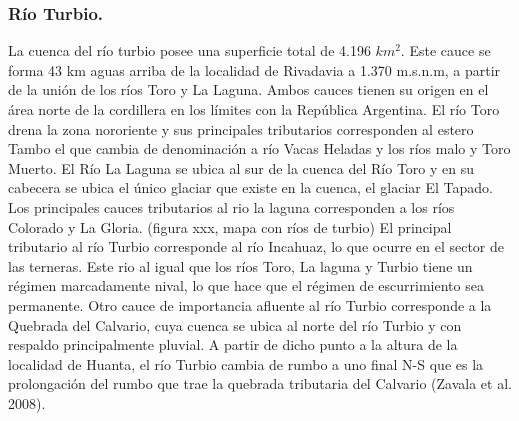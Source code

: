 \documentclass[10pt,]{article}
\begin{document}
		\subsubsection{Río Turbio.}
La cuenca del río turbio posee una superficie total de 4.196 $km^2$. Este cauce se forma 43 km aguas arriba de la localidad de Rivadavia a 1.370 m.s.n.m, a partir de la unión de los ríos Toro y La Laguna. Ambos cauces tienen su origen en el área norte de la cordillera en los límites con la República Argentina. El río Toro drena la zona nororiente y sus principales tributarios corresponden al estero Tambo el que cambia de denominación a río Vacas Heladas y los ríos malo y Toro Muerto. El Río La Laguna se ubica al sur de la cuenca del Río Toro y en su cabecera se ubica el único glaciar que existe en la cuenca, el glaciar El Tapado. Los principales cauces tributarios al rio la laguna corresponden a los ríos Colorado y La Gloria. (figura xxx, mapa con ríos de turbio) El principal tributario al río Turbio corresponde al río Incahuaz, lo que ocurre en el sector de las terneras. Este rio al igual que los ríos Toro, La laguna y Turbio tiene un régimen marcadamente nival, lo que hace que el régimen de escurrimiento sea permanente. Otro cauce de importancia afluente al río Turbio corresponde a la Quebrada del Calvario, cuya cuenca se ubica al norte del río Turbio y con respaldo principalmente pluvial. A partir de dicho punto a la altura de la localidad de Huanta, el río Turbio cambia de rumbo a uno final N-S que es la prolongación del rumbo que trae la quebrada tributaria del Calvario (Zavala et al. 2008).
\end{document}
